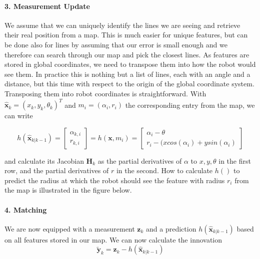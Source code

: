 \paragraph{3. Measurement Update}
We assume that we can uniquely identify the lines we are seeing and retrieve their real position from a map. This is much easier for unique features, but can be done also for lines by assuming that our error is small enough and we therefore can search through our map and pick the closest lines. As features are stored in global coordinates, we need to transpose them into how the robot would see them. In practice this is nothing but a list of lines, each with an angle and a distance, but this time with respect to the origin of the global coordinate system. Transposing them into robot coordinates is straightforward. With  $ \hat{\boldsymbol{x}}_{k}=(x_{k},y_{k},\theta_k)^T$ and $ m_i=(\alpha_i,r_i)$ the corresponding entry from the map, we can write

\begin{equation} h(\hat{\boldsymbol{x}}_{k|k-1})=\left[\begin{array}{c}\alpha_{k,i}\\r_{k,i}\end{array}\right]=h(\boldsymbol{x},m_i)=\left[\begin{array}{c}\alpha_i-\theta\\r_i-(x cos(\alpha_i)+y sin(\alpha_i)\end{array}\right]
\end{equation}

and calculate its Jacobian $ \boldsymbol{H}_{k}$ as the partial derivatives of $ \alpha$ to $ x,y,\theta$ in the first row, and the partial derivatives of $ r$ in the second. How to calculate $ h()$ to predict the radius at which the robot should see the feature with radius $ r_i$ from the map is illustrated in the figure below.



\paragraph{4. Matching}
We are now equipped with a measurement $ \boldsymbol{z}_k$ and a prediction $ h(\hat{\boldsymbol{x}}_{k|k-1})$ based on all features stored in our map. We can now calculate the innovation
\begin{equation}
\tilde{\boldsymbol{y}}_{k}=\boldsymbol{z}_{k}-h(\hat{\boldsymbol{x}}_{k|k-1})
\end{equation}

